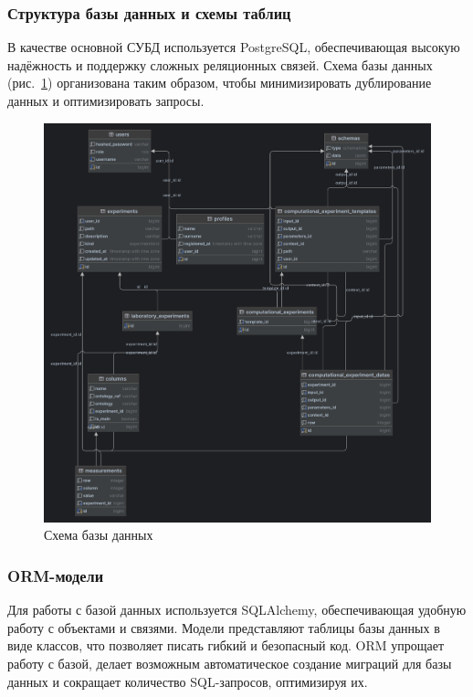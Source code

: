 \subsubsection{Структура базы данных и схемы таблиц}

В качестве основной СУБД используется PostgreSQL, обеспечивающая высокую надёжность и поддержку сложных реляционных связей.
Схема базы данных (рис.~\ref{pic:postgres_scheme}) организована таким образом, чтобы минимизировать дублирование данных и оптимизировать запросы.

\begin{figure}[H]
\centering
\includegraphics[width=\linewidth]{img/postgres_scheme.png}
\caption{Схема базы данных}
\label{pic:postgres_scheme}
\end{figure}
\vspace{0.5cm}

\subsubsection{ORM-модели}

Для работы с базой данных используется SQLAlchemy, обеспечивающая удобную работу с объектами и связями.
Модели представляют таблицы базы данных в виде классов, что позволяет писать гибкий и безопасный код.
ORM упрощает работу с базой, делает возможным автоматическое создание миграций для базы данных и сокращает количество SQL-запросов, оптимизируя их.

